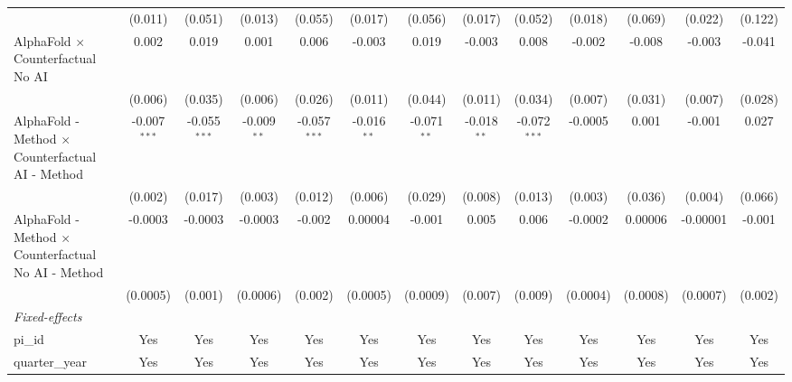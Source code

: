 \begin{tabular}{lcccccccccccc}
                                                              & (0.011)        & (0.051)        & (0.013)       & (0.055)        & (0.017)       & (0.056)       & (0.017)       & (0.052)        & (0.018)       & (0.069)     & (0.022)       & (0.122)\\   
   AlphaFold $\times$ Counterfactual No AI                    & 0.002          & 0.019          & 0.001         & 0.006          & -0.003        & 0.019         & -0.003        & 0.008          & -0.002        & -0.008      & -0.003        & -0.041\\   
                                                              & (0.006)        & (0.035)        & (0.006)       & (0.026)        & (0.011)       & (0.044)       & (0.011)       & (0.034)        & (0.007)       & (0.031)     & (0.007)       & (0.028)\\   
   AlphaFold - Method $\times$ Counterfactual AI - Method     & -0.007$^{***}$ & -0.055$^{***}$ & -0.009$^{**}$ & -0.057$^{***}$ & -0.016$^{**}$ & -0.071$^{**}$ & -0.018$^{**}$ & -0.072$^{***}$ & -0.0005       & 0.001       & -0.001        & 0.027\\   
                                                              & (0.002)        & (0.017)        & (0.003)       & (0.012)        & (0.006)       & (0.029)       & (0.008)       & (0.013)        & (0.003)       & (0.036)     & (0.004)       & (0.066)\\   
   AlphaFold - Method $\times$ Counterfactual No AI - Method  & -0.0003        & -0.0003        & -0.0003       & -0.002         & 0.00004       & -0.001        & 0.005         & 0.006          & -0.0002       & 0.00006     & -0.00001      & -0.001\\   
                                                              & (0.0005)       & (0.001)        & (0.0006)      & (0.002)        & (0.0005)      & (0.0009)      & (0.007)       & (0.009)        & (0.0004)      & (0.0008)    & (0.0007)      & (0.002)\\   
   \midrule
   \emph{Fixed-effects}\\
   pi\_id                                                     & Yes            & Yes            & Yes           & Yes            & Yes           & Yes           & Yes           & Yes            & Yes           & Yes         & Yes           & Yes\\  
   quarter\_year                                              & Yes            & Yes            & Yes           & Yes            & Yes           & Yes           & Yes           & Yes            & Yes           & Yes         & Yes           & Yes\\  

\end{tabular}
